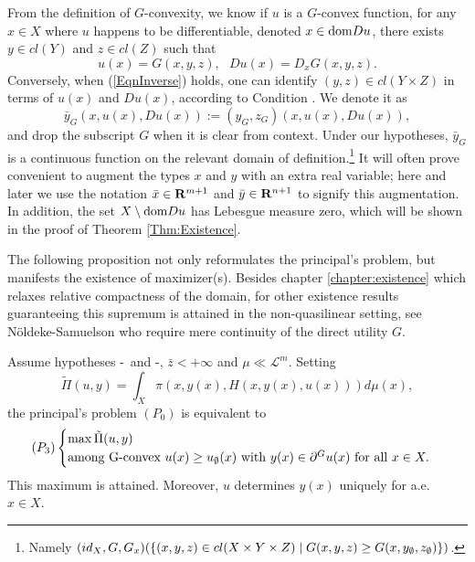 									
	From the definition of $G$-convexity, we know if $u$ is a $G$-convex function, for any $x \in X$ where $u$ happens
	to be differentiable,  denoted $x\in {\mathop{\rm dom}} Du$, there exists $y\in cl(Y)$ and $z\in cl(Z)$ such that
	\begin{equation}\label{EqnInverse}
	u(x)= G(x, y, z),\ \ \   Du(x) = D_x G(x, y, z).
	\end{equation}
	Conversely, when (\ref{EqnInverse}) holds, one can identify $(y, z) \in cl( Y \times Z)$ in terms of $u(x)$ and $Du(x)$, according to Condition \Gone. We denote it as 
	\begin{equation*}
	\bar{y}_G (x,u(x),Du(x)) := (y_G, z_G)(x,u(x),Du(x)),
	\end{equation*} 
	and drop the subscript
	$G$ when it is clear from context. 
	Under our hypotheses, $\bar y_G$ is a continuous function 
	{ on the relevant domain of 
		definition.\footnote{Namely $(id_X, G, G_x)(\{(x,y,z) \in cl(X \times Y \times Z) \mid G(x,y,z) \ge G(x,y_{\emptyset},z_{\emptyset})\})$.}}
	It will often prove convenient to augment the types $x$ and $y$ with an extra real variable;
	here and later we use the notation $\bar x \in {\mathbf R}^{m+1}$ and $\bar y \in {\mathbf R}^{n+1}$ to signify this augmentation.
	In addition, the set $X\setminus {\mathop{\rm dom}} Du$ has Lebesgue measure zero, which will be shown in the proof of Theorem \ref{Thm:Existence}.	\medskip
									
									
									
									
									
The following proposition not only reformulates the principal's problem, but manifests the existence of maximizer(s). 
Besides chapter \ref{chapter:existence} 
which relaxes relative compactness of the domain, for other existence results guaranteeing this supremum is attained in the non-quasilinear setting, 
see N\" oldeke-Samuelson \cite{NoldekeSamuelson15p} who require mere continuity of the direct utility $G$.\medskip
									

\begin{theorem}\label{Thm:Existence}
	Assume hypotheses \Gzero-\Gone ~and \Gfour-\Gfive, 
	$\bar z < +\infty$  and $\mu \ll \mathcal{L}^m$. Setting  $$\tilde{\Pi}(u,y)=\int_{X} \pi(x, y(x), H(x,y(x), u(x))) d\mu(x),$$
	the principal's problem $(P_0)$ is equivalent to
		\begin{equation*}
			(P_3)
			\begin{cases}
				\max \tilde{\Pi}(u,y) \\
				\text{\rm among }
				$G$\text{\rm-convex  $u(x) \ge u_\nul(x)$ with }
				y(x) \in \partial^G u(x)\ \text{\rm for all } x \in X.
			\end{cases}
		\end{equation*}
	This maximum is attained. Moreover, $u$ determines $y(x)$ uniquely for a.e. $x \in X$.
\end{theorem}
										
